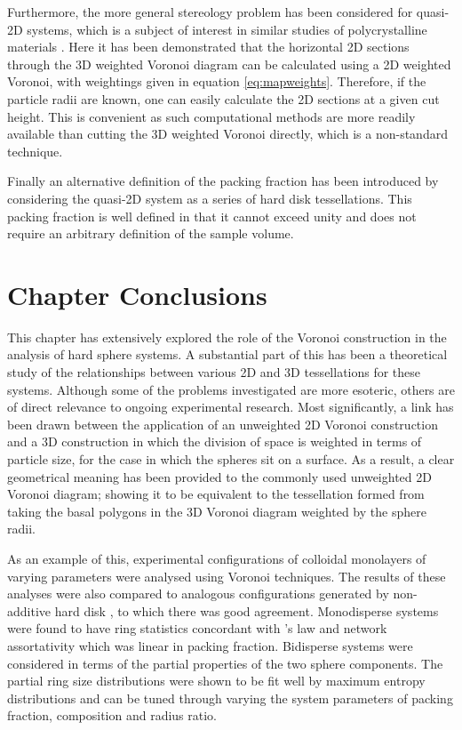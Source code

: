 Furthermore, the more general stereology problem has been considered for quasi\--2D systems, which is a subject of interest in similar studies of polycrystalline materials  \cite{Falco2017,Depriester2019}.
Here it has been demonstrated that the horizontal 2D sections through the 3D weighted Voronoi diagram can be calculated using a 2D weighted Voronoi, with weightings given in equation \eqref{eq:mapweights}.
Therefore, if the particle radii are known, one can easily calculate the 2D sections at a given cut height.
This is convenient as such computational methods are more readily available than cutting the 3D weighted Voronoi directly, which is a non\--standard technique.

Finally an alternative definition of the packing fraction has been introduced by considering the quasi\--2D system as a series of hard disk tessellations.
This packing fraction is well defined in that it cannot exceed unity and does not require an arbitrary definition of the sample volume.

\section{Chapter Conclusions}

This chapter has extensively explored the role of the Voronoi construction in the analysis of \qtd{} hard sphere systems.
A substantial part of this has been a theoretical study of the relationships between various 2D and 3D tessellations for these systems.
Although some of the problems investigated are more esoteric, others are of direct relevance to ongoing experimental research.
Most significantly, a link has been drawn between the application of an unweighted 2D Voronoi construction and a 3D construction in which the division of space is weighted in terms of particle size, for the case in which the spheres sit on a surface.
As a result, a clear geometrical meaning has been provided to the commonly used unweighted 2D Voronoi diagram; showing it to be equivalent to the tessellation 
formed from taking the basal polygons in the 3D Voronoi diagram weighted by the sphere 
radii.

As an example of this, experimental configurations of \qtd{} colloidal monolayers of varying parameters were analysed using Voronoi techniques.
The results of these analyses were also compared to analogous configurations generated by non\--additive hard disk \mc{}, to which there was good agreement.
Monodisperse systems were found to have ring statistics concordant with \lm's law and network assortativity which was linear in packing fraction.
Bidisperse systems were considered in terms of the partial properties of the two sphere components.
The partial ring size distributions were shown to be fit well by maximum entropy distributions and can be tuned through varying the system parameters of packing fraction, composition and radius ratio.


